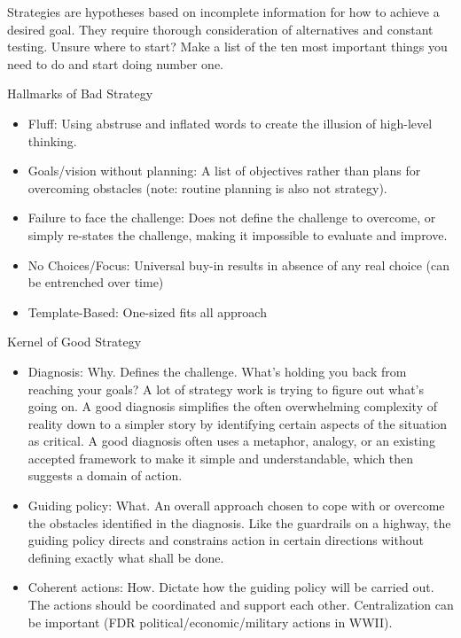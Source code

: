 \documentclass[
]{article}
\begin{document}
Strategies are hypotheses based on incomplete information for how to
achieve a desired goal. They require thorough consideration of
alternatives and constant testing. Unsure where to start? Make a list of
the ten most important things you need to do and start doing number one.

Hallmarks of Bad Strategy

\begin{itemize}
\item
  Fluff: Using abstruse and inflated words to create the illusion of
  high-level thinking.
\item
  Goals/vision without planning: A list of objectives rather than plans
  for overcoming obstacles (note: routine planning is also not
  strategy).
\item
  Failure to face the challenge: Does not define the challenge to
  overcome, or simply re-states the challenge, making it impossible to
  evaluate and improve.
\item
  No Choices/Focus: Universal buy-in results in absence of any real
  choice (can be entrenched over time)
\item
  Template-Based: One-sized fits all approach
\end{itemize}

Kernel of Good Strategy

\begin{itemize}
\item
  Diagnosis: Why. Defines the challenge. What's holding you back from
  reaching your goals? A lot of strategy work is trying to figure out
  what's going on. A good diagnosis simplifies the often overwhelming
  complexity of reality down to a simpler story by identifying certain
  aspects of the situation as critical. A good diagnosis often uses a
  metaphor, analogy, or an existing accepted framework to make it simple
  and understandable, which then suggests a domain of action.
\item
  Guiding policy: What. An overall approach chosen to cope with or
  overcome the obstacles identified in the diagnosis. Like the
  guardrails on a highway, the guiding policy directs and constrains
  action in certain directions without defining exactly what shall be
  done.
\item
  Coherent actions: How. Dictate how the guiding policy will be carried
  out. The actions should be coordinated and support each other.
  Centralization can be important (FDR political/economic/military
  actions in WWII).
\end{itemize}
\end{document}
